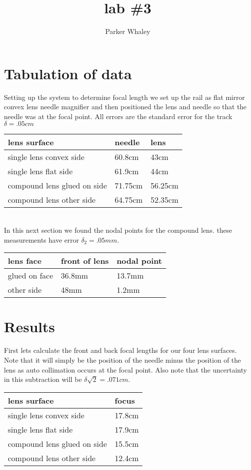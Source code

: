 \documentclass[12pt,a4paper]{article}
\author{Parker Whaley}
\title{lab \#3}
\begin{document}
\maketitle

\section{Tabulation of data}
Setting up the system to determine focal length we set up the rail as flat mirror convex lens needle magnifier and then positioned the lens and needle so that the needle was at the focal point.  All errors are the standard error for the track $\delta = .05cm$

\begin{tabular}{|l|l|l|}
\hline
lens surface & needle & lens \\
\hline
single lens convex side & 60.8cm & 43cm \\
\hline
single lens flat side & 61.9cm & 44cm \\
\hline
compound lens glued on side & 71.75cm & 56.25cm \\
\hline
compound lens other side & 64.75cm & 52.35cm \\
\hline

\end{tabular}\\

In this next section we found the nodal points for the compound lens. these measurements have error $\delta_2=.05mm$.

\begin{tabular}{|l|l|l|}
\hline
lens face & front of lens & nodal point\\
\hline
glued on face & 36.8mm & 13.7mm\\
\hline
other side & 48mm & 1.2mm\\
\hline

\end{tabular}

\section{Results}
First lets calculate the front and back focal lengths for our four lens surfaces.  Note that it will simply be the position of the needle minus the position of the lens as auto collimation occurs at the focal point.  Also note that the uncertainty in this subtraction will be $\delta\sqrt{2}=.071cm$.\\
\begin{tabular}{|l|l|}
\hline
lens surface & focus \\
\hline
single lens convex side & 17.8cm \\
\hline
single lens flat side & 17.9cm \\
\hline
compound lens glued on side & 15.5cm \\
\hline
compound lens other side & 12.4cm \\
\hline

\end{tabular}\\
\end{document}
